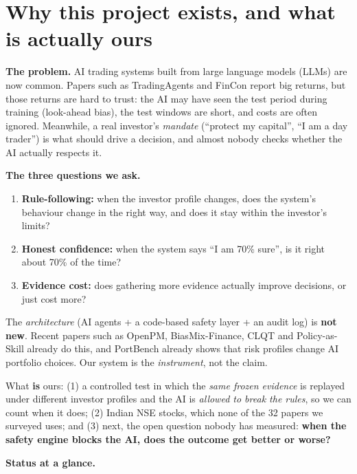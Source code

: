 \documentclass[10.5pt,a4paper]{article}
\begin{document}
\section{Why this project exists, and what is actually ours}

\textbf{The problem.} AI trading systems built from large language models (LLMs) are now common. Papers such as TradingAgents and FinCon report big returns, but those returns are hard to trust: the AI may have seen the test period during training (look-ahead bias), the test windows are short, and costs are often ignored. Meanwhile, a real investor's \emph{mandate} (``protect my capital'', ``I am a day trader'') is what should drive a decision, and almost nobody checks whether the AI actually respects it.

\textbf{The three questions we ask.}
\begin{enumerate}
\item \textbf{Rule-following:} when the investor profile changes, does the system's behaviour change in the right way, and does it stay within the investor's limits?
\item \textbf{Honest confidence:} when the system says ``I am 70\% sure'', is it right about 70\% of the time?
\item \textbf{Evidence cost:} does gathering more evidence actually improve decisions, or just cost more?
\end{enumerate}

\begin{warnbox}[title={\bfseries Be honest about what is new},colbacktitle=gold]
The \emph{architecture} (AI agents + a code-based safety layer + an audit log) is \textbf{not new}. Recent papers such as OpenPM, BiasMix-Finance, CLQT and Policy-as-Skill already do this, and PortBench already shows that risk profiles change AI portfolio choices. Our system is the \emph{instrument}, not the claim.

What \textbf{is} ours: (1) a controlled test in which the \emph{same frozen evidence} is replayed under different investor profiles and the AI is \emph{allowed to break the rules}, so we can count when it does; (2) Indian NSE stocks, which none of the 32 papers we surveyed uses; and (3) next, the open question nobody has measured: \textbf{when the safety engine blocks the AI, does the outcome get better or worse?}
\end{warnbox}

\textbf{Status at a glance.}
\end{document}

